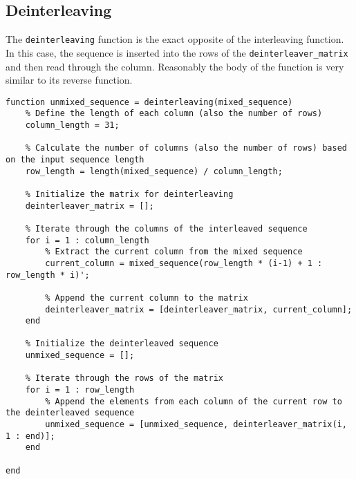\subsection{Deinterleaving}\label{deinterleaving}
The \texttt{deinterleaving} function is the exact opposite of the interleaving function. In this case, the sequence is inserted into the rows of the \texttt{deinterleaver\_matrix} and then read through the column. Reasonably the body of the function is very similar to its reverse function.

\begin{lstlisting}
function unmixed_sequence = deinterleaving(mixed_sequence)
    % Define the length of each column (also the number of rows)
    column_length = 31;

    % Calculate the number of columns (also the number of rows) based on the input sequence length
    row_length = length(mixed_sequence) / column_length;

    % Initialize the matrix for deinterleaving
    deinterleaver_matrix = [];

    % Iterate through the columns of the interleaved sequence
    for i = 1 : column_length
        % Extract the current column from the mixed sequence
        current_column = mixed_sequence(row_length * (i-1) + 1 : row_length * i)';
        
        % Append the current column to the matrix
        deinterleaver_matrix = [deinterleaver_matrix, current_column];
    end
    
    % Initialize the deinterleaved sequence
    unmixed_sequence = [];

    % Iterate through the rows of the matrix
    for i = 1 : row_length
        % Append the elements from each column of the current row to the deinterleaved sequence
        unmixed_sequence = [unmixed_sequence, deinterleaver_matrix(i, 1 : end)];
    end

end
\end{lstlisting}


